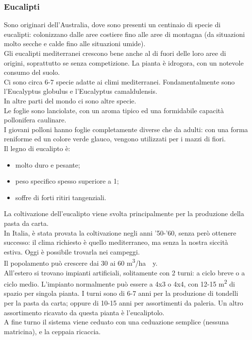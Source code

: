 \subsubsection{Eucalipti}
Sono originari dell'Australia, dove sono presenti un centinaio di specie di eucalipti: colonizzano dalle aree costiere fino alle aree di montagna (da situazioni molto secche e calde fino alle situazioni umide).\\
Gli eucalipti mediterranei crescono bene anche al di fuori delle loro aree di origini, soprattutto se senza competizione. La pianta è idrogora, con un notevole consumo del suolo.\\
Ci sono circa 6-7 specie adatte ai climi mediterranei. Fondamentalmente sono l'Eucalyptus globulus e l'Eucalyptus camaldulensis.\\
In altre parti del mondo ci sono altre specie.\\
Le foglie sono lanciolate, con un aroma tipico ed una formidabile capacità pollonifera caulinare.\\
I giovani polloni hanno foglie completamente diverse che da adulti: con una forma reniforme ed un colore verde glauco, vengono utilizzati per i mazzi di fiori.\\
Il legno di eucalipto è:
\begin{itemize}[nosep]
    \item molto duro e pesante;
    \item peso specifico spesso superiore a 1; 
    \item soffre di forti ritiri tangenziali.
\end{itemize}
La coltivazione dell'eucalipto viene svolta principalmente per la produzione della pasta da carta.\\
In Italia, è stata provata la coltivazione negli anni '50-'60, senza però ottenere successo: il clima richiesto è quello mediterraneo, ma senza la nostra siccità estiva. Oggi è possibile trovarla nei campeggi.\\
Il popolamento può crescere dai 30 ai 60 \unit{m^3/ha \cdot y}.\\
All'estero si trovano impianti artificiali, solitamente con 2 turni: a ciclo breve o a ciclo medio. L'impianto normalmente può essere a 4x3 o 4x4, con 12-15 \unit{m^2} di spazio per singola pianta. I turni sono di 6-7 anni per la produzione di tondelli per la pasta da carta; oppure di 10-15 anni per assortimenti da paleria. Un altro assortimento ricavato da questa pianta è l'eucaliptolo.\\
A fine turno il sistema viene ceduato con una ceduazione semplice (nessuna matricina), e la ceppaia ricaccia.\\
